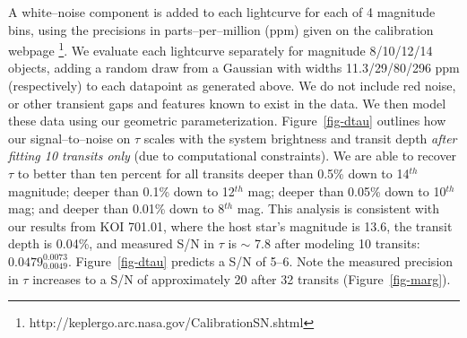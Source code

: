A white--noise component is added to each lightcurve for each of 4
magnitude bins, using the precisions in parts--per--million (ppm)
given on the \kepler calibration
webpage \footnote{http://keplergo.arc.nasa.gov/CalibrationSN.shtml}.
We evaluate each lightcurve separately for magnitude 8/10/12/14
objects, adding a random draw from a Gaussian with widths
11.3/29/80/296 ppm (respectively) to each datapoint as generated
above.  We do not include red noise, or other transient gaps and
features known to exist in the \kepler data.  We then model these data
using our geometric parameterization.  Figure~\ref{fig-dtau} outlines
how our signal--to--noise on $\tau$ scales with the system brightness
and transit depth {\it after fitting 10 transits only} (due to
computational constraints).  We are able to recover $\tau$ to better
than ten percent for all transits deeper than 0.5\% down to 14$^{th}$
magnitude; deeper than 0.1\% down to 12$^{th}$ mag; deeper than 0.05\%
down to 10$^{th}$ mag; and deeper than 0.01\% down to 8$^{th}$ mag.
This analysis is consistent with our results from KOI 701.01, where
the host star's magnitude is 13.6, the transit depth is 0.04\%, and
measured S/N in $\tau$ is $\sim$ 7.8 after modeling 10 transits:
$0.0479_{0.0049}^{0.0073}$.  Figure~\ref{fig-dtau} predicts a S/N of
5--6.  Note the measured precision in $\tau$ increases to a S/N of
approximately 20 after 32 transits (Figure~\ref{fig-marg}).

